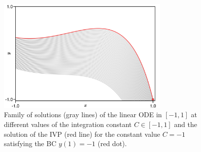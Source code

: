 \documentclass[../main.tex]{subfiles}
\begin{document}
\begin{example_continued}
     \begin{figure}[H]
         \centering 
         \includegraphics[keepaspectratio, width=0.75\textwidth]{../figures/figure1.2.0.1.png}
         \caption{Family of solutions (gray lines) of the linear ODE in $[-1,1]$ at different values of the integration constant $C\in[-1,1]$ and the solution of the IVP (red line) for the constant value $C=-1$ satisfying the BC $y(1)=-1$ (red dot).}
         \label{fig1.2.0.1}
     \end{figure}
     
\end{example_continued}
\end{document}
